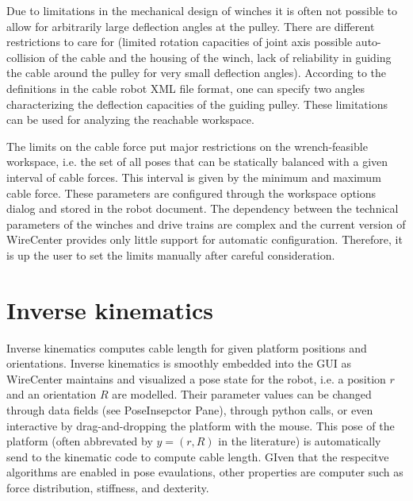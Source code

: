 \documentclass[11pt,a4paper,onepage,openany]{book}
\begin{document}
Due to limitations in the mechanical design of winches it is often not possible
to allow for arbitrarily large deflection angles at the pulley. There are
different restrictions to care for (limited rotation capacities of joint axis
possible auto-collision of the cable and the housing of the winch, lack of
reliability in guiding the cable around the pulley for very small deflection
angles). According to the definitions in the cable robot XML file format, one
can specify two angles characterizing the deflection capacities of the guiding
pulley. These limitations can be used for analyzing the reachable workspace.

The limits on the cable force put major restrictions on the wrench-feasible
workspace, i.e. the set of all poses that can be statically balanced with a
given interval of cable forces. This interval is given by the minimum and
maximum cable force. These parameters are configured through the workspace
options dialog and stored in the robot document. The dependency between the
technical parameters of the winches and drive trains are complex and the
current version of WireCenter provides only little support for automatic
configuration. Therefore, it is up the user to set the limits manually after
careful consideration.

\section{Inverse kinematics}
Inverse kinematics computes cable length for given platform positions and
orientations. Inverse kinematics is smoothly embedded into the GUI as 
WireCenter maintains and visualized a pose state for the robot, i.e. a position 
$r$ and an orientation $R$ are modelled. Their parameter values can be changed
through data fields (see PoseInsepctor Pane), through python calls, or even
interactive by drag-and-dropping the platform with the mouse. This pose of the platform
(often abbrevated by $y=(r,R)$ in the literature) is automatically send to the 
kinematic code to compute cable length. GIven that the respecitve algorithms
are enabled in pose evaulations, other properties are computer such as force 
distribution, stiffness, and dexterity. 
\end{document}

